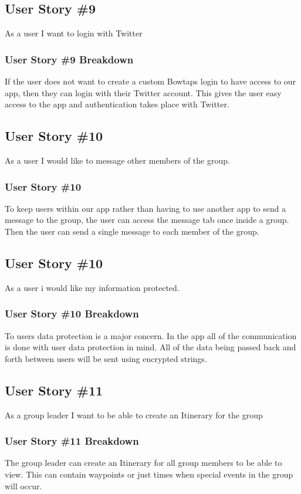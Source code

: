 \subsection{User Story \#9}
As a user I want to login with Twitter
\subsubsection{User Story \#9 Breakdown}
If the user does not want to create a custom Bowtaps login to have access to our app, then they can login with their Twitter account.  This gives the user easy access to the app and authentication takes place with Twitter.
\subsection{User Story \#10}
As a user I would like to message other members of the group.
\subsubsection{User Story \#10}
To keep users within our app rather than having to use another app to send a message to the group, the user can access the message tab once inside a group.  Then the user can send a single message to each member of the group.

\subsection{User Story \#10} 
As a user i would like my information protected.
\subsubsection{User Story \#10 Breakdown}
To users data protection is a major concern.  In the app all of the communication is done with user data protection in mind.  All of the data being passed back and forth between users will be sent using encrypted strings. 

\subsection{User Story \#11} 
As a group leader I want to be able to create an Itinerary for the group
\subsubsection{User Story \#11 Breakdown}
The group leader can create an Itinerary for all group members to be able to view.  This can contain waypoints or just times when special events in the group will occur.

